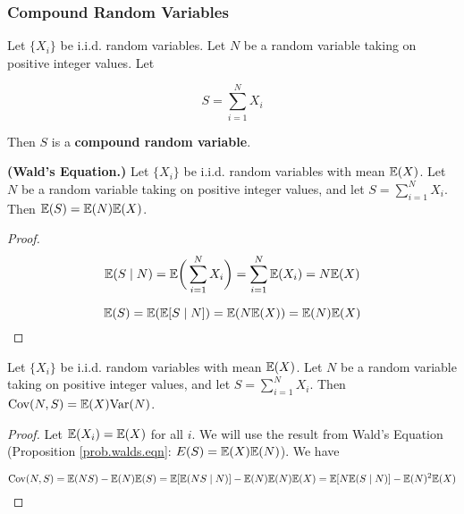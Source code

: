 \begin{theorem}

\subsubsection{Compound Random Variables}

\begin{definition}Let \(\{X_i\}\) be i.i.d. random variables. Let \(N\) be a random variable taking on positive integer values. Let

\[
S = \sum_{i=1}^N X_i
\]

Then \(S\) is a \textbf{compound random variable}.

\end{definition}

\begin{proposition}\label{prob.walds.eqn} \textbf{(Wald's Equation.)} Let \(\{X_i\}\) be i.i.d. random variables with mean \(\E(X)\). Let \(N\) be a random variable taking on positive integer values, and let \(S = \sum_{i=1}^N X_i\). Then \(\E(S) = \E(N) \E(X)\).

\begin{proof}

\[
\E(S \mid N) = \E \bigg( \sum_{i=1}^N X_i \bigg) = \sum_{i=1}^N \E(X_i) = N \E(X) 
\]

\[
\E(S) = \E(\E[S \mid N]) = \E(N \E(X)) = \E(N) \E(X)
\]

\end{proof}

\end{proposition}

\begin{proposition} Let \(\{X_i\}\) be i.i.d. random variables with mean \(\E(X)\). Let \(N\) be a random variable taking on positive integer values, and let \(S = \sum_{i=1}^N X_i\). Then \(\Cov(N, S) = \E(X) \Var(N)\).

\end{proposition}

\begin{proof} Let \(\E(X_i) = \E(X)\) for all \(i\). We will use the result from Wald's Equation (Proposition \ref{prob.walds.eqn}: \(E(S) = \E(X) \E(N)\)). We have

\begin{equation} \label{prob.pm.ch3.98.1}
\Cov(N, S) = \E(NS) - \E(N) \E(S) = \E[ \E(NS \mid N)] - \E(N) \E(N) \E(X)= \E[ N\E(S \mid N)] - \E(N)^2 \E(X)
\end{equation}


\end{proof}
\end{theorem}
